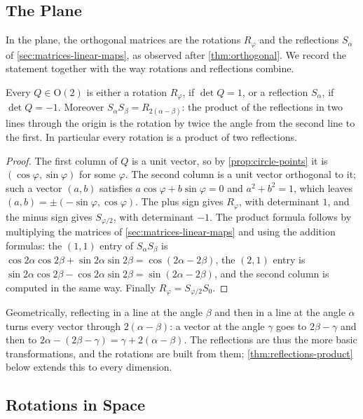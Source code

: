 \subsection{The Plane}

In the plane, the orthogonal matrices are the rotations $R_\varphi$ and the reflections $S_\alpha$ of \cref{sec:matrices-linear-maps}, as observed after \cref{thm:orthogonal}. We record the statement together with the way rotations and reflections combine.

\begin{proposition}
\label{prop:orthogonal-plane}
Every $Q\in\mathrm O(2)$ is either a rotation $R_\varphi$, if $\det Q=1$, or a reflection $S_\alpha$, if $\det Q=-1$. Moreover $S_\alpha S_\beta=R_{2(\alpha-\beta)}$: the product of the reflections in two lines through the origin is the rotation by twice the angle from the second line to the first. In particular every rotation is a product of two reflections.
\end{proposition}

\begin{proof}
The first column of $Q$ is a unit vector, so by \cref{prop:circle-points} it is $(\cos\varphi,\sin\varphi)$ for some $\varphi$. The second column is a unit vector orthogonal to it; such a vector $(a,b)$ satisfies $a\cos\varphi+b\sin\varphi=0$ and $a^2+b^2=1$, which leaves $(a,b)=\pm(-\sin\varphi,\cos\varphi)$. The plus sign gives $R_\varphi$, with determinant $1$, and the minus sign gives $S_{\varphi/2}$, with determinant $-1$. The product formula follows by multiplying the matrices of \cref{sec:matrices-linear-maps} and using the addition formulas: the $(1,1)$ entry of $S_\alpha S_\beta$ is $\cos2\alpha\cos2\beta+\sin2\alpha\sin2\beta=\cos(2\alpha-2\beta)$, the $(2,1)$ entry is $\sin2\alpha\cos2\beta-\cos2\alpha\sin2\beta=\sin(2\alpha-2\beta)$, and the second column is computed in the same way. Finally $R_\varphi=S_{\varphi/2}S_0$.
\end{proof}

Geometrically, reflecting in a line at the angle $\beta$ and then in a line at the angle $\alpha$ turns every vector through $2(\alpha-\beta)$: a vector at the angle $\gamma$ goes to $2\beta-\gamma$ and then to $2\alpha-(2\beta-\gamma)=\gamma+2(\alpha-\beta)$. The reflections are thus the more basic transformations, and the rotations are built from them; \cref{thm:reflections-product} below extends this to every dimension.

\subsection{Rotations in Space}

